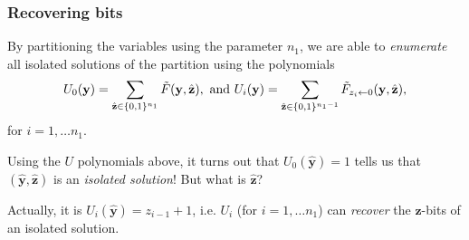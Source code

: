 \documentclass{beamer}
\begin{document}
\begin{frame}
    \frametitle{Recovering bits}
        By partitioning the variables using the parameter $n_1$, we are able to \textit{enumerate} all isolated solutions of the partition using the polynomials
        $$
            U_0(\mathbf{y}) = \sum_{\hat{\mathbf{z}} \in \{0,1\}^{n_1}} \Tilde{F}(\mathbf{y},\hat{\mathbf{z}}), \text{ and } U_i(\mathbf{y}) = \sum_{\hat{\mathbf{z}}\in \{0,1\}^{n_1 - 1}} \Tilde{F}_{z_i \leftarrow 0}(\mathbf{y}, \hat{\mathbf{z}}),
        $$
        for $i = 1, \dots n_1$. \pause

        Using the $U$ polynomials above, it turns out that $U_0(\hat{\mathbf{y}}) = 1$ tells us that $(\hat{\mathbf{y}}, \hat{\mathbf{z}})$ is an \textit{isolated solution}! But what is $\hat{\mathbf{z}}$?

        \pause 

        Actually, it is $U_i(\hat{\mathbf{y}}) = z_{i - 1} + 1$, i.e. $U_i$ (for $i = 1, \dots n_1$) can \textit{recover} the $\mathbf{z}$-bits of an isolated solution.
\end{frame}
\end{document}
